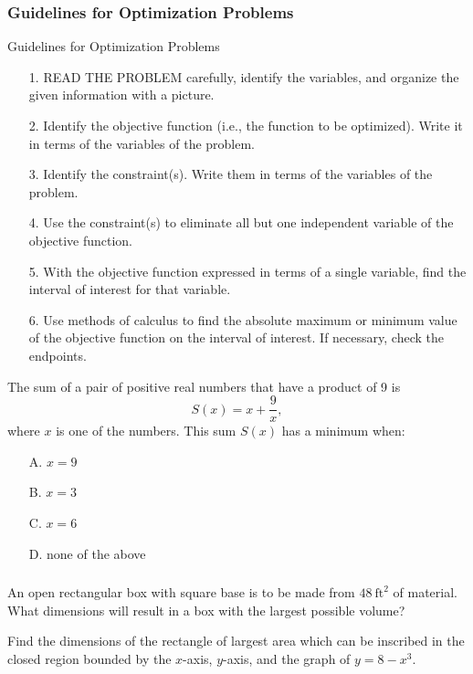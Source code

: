 \documentclass[cal1spr16Lectures.tex]{subfiles}
\begin{document}
\subsubsection{Guidelines for Optimization Problems}

\begin{frame}{\small Guidelines for Optimization Problems}
\footnotesize
\begin{itemize}
\item[1.] \alert{READ THE PROBLEM} carefully, identify the variables, and organize the given information with a picture.
\item[2.] Identify the objective function (i.e., the function to be optimized).  Write it in terms of the variables of the problem.
\item[3.] Identify the constraint(s).  Write them in terms of the variables of the problem.
\item[4.] Use the constraint(s) to eliminate all but one independent variable of the objective function.  
\item[5.] With the objective function expressed in terms of a single variable, find the interval of interest for that variable.
\item[6.] Use methods of calculus to find the absolute maximum or minimum value of the objective function on the interval of interest.  If necessary, \alert{check the endpoints}.
\end{itemize}
\end{frame}

\begin{frame}
\begin{que}
The sum of a pair of positive real numbers that have a product of 9 is 
\[S(x) = x + \frac{9}{x},\]
where $x$ is one of the numbers.  This sum $S(x)$ has a minimum when:
\begin{itemize}
\item[A. ] $x=9$
\item[B. ] $x=3$
\item[C. ] $x=6$
\item[D. ] none of the above
\end{itemize}
\end{que}
\end{frame}

\begin{frame}%
\frametitle{}
\small
\begin{exe} An open rectangular box with square base is to be made from $48\ \text{ft}^2$ of material.  What dimensions will result in a box with the largest possible volume? \end{exe}

\vspace{1pc}
\begin{exe} Find the dimensions of the rectangle of largest area which can be inscribed in the closed region bounded by the $x$-axis, $y$-axis, and the graph of $y=8-x^3$. \end{exe}
\end{frame}
\end{document}
